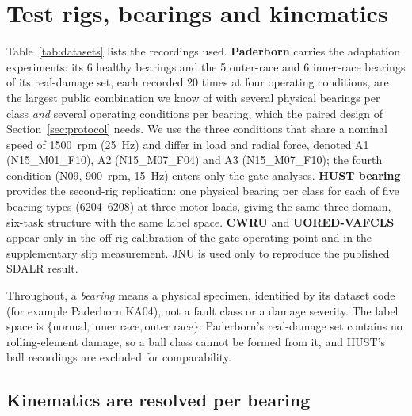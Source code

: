 \section{Test rigs, bearings and kinematics}
\label{sec:data}



Table~\ref{tab:datasets} lists the recordings used. \textbf{Paderborn} \cite{lessmeier2016} carries the adaptation
experiments: its 6 healthy bearings and the 5 outer-race and 6 inner-race bearings of its real-damage set, each recorded 20
times at four operating conditions, are the largest public combination we know of with several physical bearings per class
\emph{and} several operating conditions per bearing, which the paired design of Section~\ref{sec:protocol} needs. We use the
three conditions that share a nominal speed of \SI{1500}{rpm} (\SI{25}{Hz}) and differ in load and radial force, denoted A1
(N15\_M01\_F10), A2 (N15\_M07\_F04) and A3 (N15\_M07\_F10); the fourth condition (N09, \SI{900}{rpm}, \SI{15}{Hz}) enters
only the gate analyses.
\textbf{HUST bearing} \cite{thuan2023hust} provides the second-rig replication: one physical bearing per class for each of
five bearing types (6204--6208) at three motor loads, giving the same three-domain, six-task structure with the same label
space. \textbf{CWRU} \cite{smith2015} and \textbf{UORED-VAFCLS} \cite{sehri2023uored} appear only in the off-rig calibration of the
gate operating point and in the supplementary slip measurement. JNU \cite{li2013jnu} is used only to reproduce the published SDALR result.

Throughout, a \emph{bearing} means a physical specimen, identified by its dataset code (for example Paderborn KA04), not a
fault class or a damage severity. The label space is $\{\text{normal},\text{inner race},\text{outer race}\}$: Paderborn's
real-damage set contains no rolling-element damage, so a ball class cannot be formed from it, and HUST's ball recordings are
excluded for comparability.

\subsection{Kinematics are resolved per bearing}
\label{sec:kinematics}

